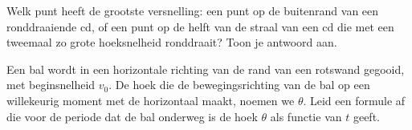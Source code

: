 \documentclass{ximera}
\begin{document}






\begin{exercise}
	Welk punt heeft de grootste versnelling: een punt op de buitenrand van een ronddraaiende cd, of een punt op de helft van de straal van een cd die met een tweemaal zo grote hoeksnelheid ronddraait? Toon je antwoord aan.
\end{exercise}

\begin{exercise}
	Een bal wordt in een horizontale richting van de rand van een rotswand gegooid, met beginsnelheid $v_0$. De hoek die de bewegingsrichting van de bal op een willekeurig moment met de horizontaal maakt, noemen we $\theta$. Leid een formule af die voor de periode dat de bal onderweg is de hoek $\theta$ als functie van $t$ geeft.
\end{exercise}
\end{document}
